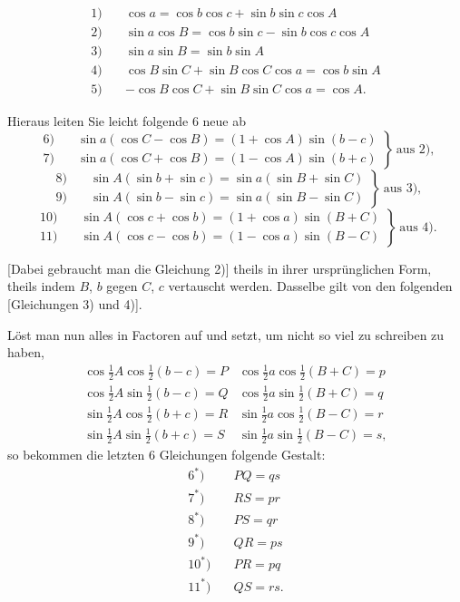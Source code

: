 \[
\begin{aligned}
1) \quad & \cos a = \cos b \cos c + \sin b \sin c \cos A \\
2) \quad & \sin a \cos B = \cos b \sin c - \sin b \cos c \cos A \\
3) \quad & \sin a \sin B = \sin b \sin A \\
4) \quad & \cos B \sin C + \sin B \cos C \cos a = \cos b \sin A \\
5) \quad & -\cos B \cos C + \sin B \sin C \cos a = \cos A.
\end{aligned}
\]

Hieraus leiten Sie leicht folgende 6 neue ab
\[
\left.\begin{aligned}
6) \quad & \sin a(\cos C - \cos B) = (1+\cos A)\sin(b-c) \\
7) \quad & \sin a(\cos C + \cos B) = (1-\cos A)\sin(b+c)
\end{aligned}\right\}\ \text{aus 2),}
\]
\[
\left.\begin{aligned}
8) \quad & \sin A(\sin b + \sin c) = \sin a(\sin B + \sin C) \\
9) \quad & \sin A(\sin b - \sin c) = \sin a(\sin B - \sin C)
\end{aligned}\right\}\ \text{aus 3),}
\]
\[
\left.\begin{aligned}
10) \quad & \sin A(\cos c + \cos b) = (1+\cos a)\sin(B+C) \\
11) \quad & \sin A(\cos c - \cos b) = (1-\cos a)\sin(B-C)
\end{aligned}\right\}\ \text{aus 4).}
\]

[Dabei gebraucht man die Gleichung 2)] theils in ihrer ursprünglichen Form,
theils indem $B$, $b$ gegen $C$, $c$ vertauscht werden. Dasselbe gilt von den
folgenden [Gleichungen 3) und 4)].

Löst man nun alles in Factoren auf und setzt, um nicht so viel zu schreiben
zu haben,
\[
\begin{array}{ll}
\cos \tfrac12 A \cos \tfrac12 (b-c) = P & \cos \tfrac12 a \cos \tfrac12 (B+C) = p \\[4pt]
\cos \tfrac12 A \sin \tfrac12 (b-c) = Q & \cos \tfrac12 a \sin \tfrac12 (B+C) = q \\[4pt]
\sin \tfrac12 A \cos \tfrac12 (b+c) = R & \sin \tfrac12 a \cos \tfrac12 (B-C) = r \\[4pt]
\sin \tfrac12 A \sin \tfrac12 (b+c) = S & \sin \tfrac12 a \sin \tfrac12 (B-C) = s,
\end{array}
\]
so bekommen die letzten 6 Gleichungen folgende Gestalt:
\[
\begin{aligned}
6^\ast) \quad & PQ = qs \\
7^\ast) \quad & RS = pr \\
8^\ast) \quad & PS = qr \\
9^\ast) \quad & QR = ps \\
10^\ast) \quad & PR = pq \\
11^\ast) \quad & QS = rs.
\end{aligned}
\]
